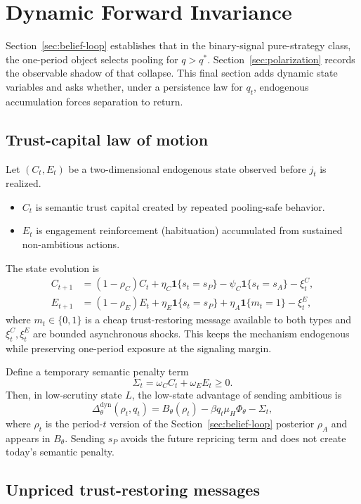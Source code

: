 \section{Dynamic Forward Invariance}
\label{sec:dynamic-invariance}

Section~\ref{sec:belief-loop} establishes that in the binary-signal pure-strategy class, the one-period object selects pooling for $q>q^*$. Section~\ref{sec:polarization} records the observable shadow of that collapse. This final section adds dynamic state variables and asks whether, under a persistence law for $q_t$, endogenous accumulation forces separation to return.

\subsection{Trust-capital law of motion}

Let $(C_t,E_t)$ be a two-dimensional endogenous state observed before $j_t$ is realized.
\begin{itemize}
\item $C_t$ is semantic trust capital created by repeated pooling-safe behavior.
\item $E_t$ is engagement reinforcement (habituation) accumulated from sustained non-ambitious actions.
\end{itemize}
The state evolution is
\[
\begin{aligned}
C_{t+1}&=(1-\rho_C)C_t + \eta_C\mathbf 1\{s_t=s_P\} - \psi_C\mathbf 1\{s_t=s_A\} -\xi_t^C,\\
E_{t+1}&=(1-\rho_E)E_t + \eta_E\mathbf 1\{s_t=s_P\}+\eta_A\mathbf 1\{m_t=1\} -\xi_t^E,
\end{aligned}
\]
where $m_t\in\{0,1\}$ is a cheap trust-restoring message available to both types and $\xi_t^C,\xi_t^E$ are bounded asynchronous shocks. This keeps the mechanism endogenous while preserving one-period exposure at the signaling margin.

Define a temporary semantic penalty term
\[
\Sigma_t=\omega_C C_t+\omega_E E_t\ge 0.
\]
Then, in low-scrutiny state $L$, the low-state advantage of sending ambitious is
\[
\Delta_\theta^{\mathrm{dyn}}(\rho_t,q_t)=B_\theta(\rho_t)-\beta q_t\mu_H\Phi_\theta-\Sigma_t,
\]
where $\rho_t$ is the period-$t$ version of the Section~\ref{sec:belief-loop} posterior $\rho_A$ and appears in $B_\theta$. Sending $s_P$ avoids the future repricing term and does not create today's semantic penalty.

\subsection{Unpriced trust-restoring messages}

